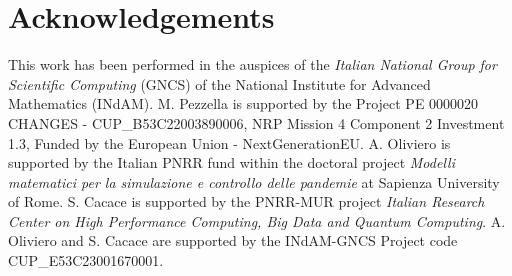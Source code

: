 \documentclass[10pt]{article}
\theoremstyle{remark}
\theoremstyle{definition}
\theoremstyle{remark}
\begin{document}
\section*{Acknowledgements}
This work has been performed in the auspices of the \textit{Italian National Group for Scientific Computing} (GNCS) of the National Institute for Advanced Mathematics (INdAM). M. Pezzella is supported by the Project PE 0000020 CHANGES - CUP\!\_B53C22003890006, NRP Mission 4 Component 2 Investment 1.3, Funded by the European Union - NextGenerationEU. A. Oliviero is supported by the Italian PNRR fund within the doctoral project \textit{Modelli matematici per la simulazione e controllo
delle pandemie} at Sapienza University of Rome. S. Cacace is supported by the PNRR-MUR project \textit{Italian Research Center on High Performance Computing, Big Data and Quantum Computing}. A. Oliviero and S. Cacace are supported by the INdAM-GNCS Project code CUP\!\_E53C23001670001.


%
%

% 



%
%
\end{document}
